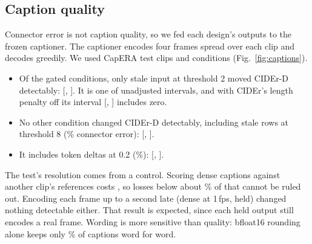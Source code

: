 \documentclass[conference]{IEEEtran}
\begin{document}
\subsection{Caption quality}
Connector error is not caption quality, so we fed each design's outputs to the frozen captioner. The captioner
encodes four frames spread over each clip and decodes greedily. We used \CapClips{} CapERA test clips and
\CapConditions{} conditions (Fig.~\ref{fig:captions}).
\begin{itemize}
\item Of the \CapGateConds{} gated conditions, only stale input at threshold 2 moved CIDEr-D detectably:
\CapAtwoDelta{} [\CapAtwoLo, \CapAtwoHi]. It is one of \CapUnadjusted{} unadjusted intervals, and with CIDEr's length penalty
off its interval [\CapAtwoNlLo, \CapAtwoNlHi] includes zero.
\item No other condition changed CIDEr-D detectably, including stale rows at threshold 8 (\CapBeightErr\% connector error):
\CapBeightDelta{} [\CapBeightLo, \CapBeightHi].
\item It includes token deltas at 0.2 (\CapCtwoErr\%): \CapCtwoDelta{} [\CapCtwoLo, \CapCtwoHi].
\end{itemize}
The test's resolution comes from a control. Scoring dense captions against another clip's references costs
\CapShuffledDelta, so losses below about \CapResolutionPct\% of that cannot be ruled out. Encoding each frame up to a
second late (dense at 1\,fps, held) changed nothing detectable either. That result is expected, since each held
output still encodes a real frame. Wording is more sensitive than quality: bfloat16 rounding alone keeps only
\CapBfloatSame\% of captions word for word.
\end{document}
